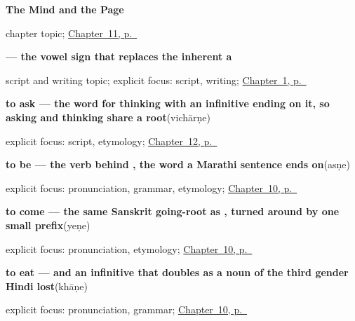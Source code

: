 \noindent\begin{minipage}[t]{\linewidth}
\raggedright
\textbf{The Mind and the Page}\par
\footnotesize chapter topic; \hyperref[ch:mr-mind-and-page]{Chapter~11, p.~\pageref*{ch:mr-mind-and-page}}
\end{minipage}\par\smallskip

\noindent\begin{minipage}[t]{\linewidth}
\raggedright
\textbf{ — the vowel sign that replaces the inherent a}\par
\footnotesize script and writing topic; explicit focus: script, writing; \hyperref[ch:first-greeting-script]{Chapter~1, p.~\pageref*{ch:first-greeting-script}}
\end{minipage}\par\smallskip

\noindent\begin{minipage}[t]{\linewidth}
\raggedright
\textbf{to ask — the word for thinking with an infinitive ending on it, so asking and thinking share a root}\enspace\emph{}\enspace(vichārṇe)\par
\footnotesize explicit focus: script, etymology; \hyperref[ch:mr-doing-verbs]{Chapter~12, p.~\pageref*{ch:mr-doing-verbs}}
\end{minipage}\par\smallskip

\noindent\begin{minipage}[t]{\linewidth}
\raggedright
\textbf{to be — the verb behind , the word a Marathi sentence ends on}\enspace\emph{}\enspace(asṇe)\par
\footnotesize explicit focus: pronunciation, grammar, etymology; \hyperref[ch:mr-core-verbs]{Chapter~10, p.~\pageref*{ch:mr-core-verbs}}
\end{minipage}\par\smallskip

\noindent\begin{minipage}[t]{\linewidth}
\raggedright
\textbf{to come — the same Sanskrit going-root as , turned around by one small prefix}\enspace\emph{}\enspace(yeṇe)\par
\footnotesize explicit focus: pronunciation, etymology; \hyperref[ch:mr-core-verbs]{Chapter~10, p.~\pageref*{ch:mr-core-verbs}}
\end{minipage}\par\smallskip

\noindent\begin{minipage}[t]{\linewidth}
\raggedright
\textbf{to eat — and an infinitive that doubles as a noun of the third gender Hindi lost}\enspace\emph{}\enspace(khāṇe)\par
\footnotesize explicit focus: pronunciation, grammar; \hyperref[ch:mr-core-verbs]{Chapter~10, p.~\pageref*{ch:mr-core-verbs}}
\end{minipage}\par\smallskip

